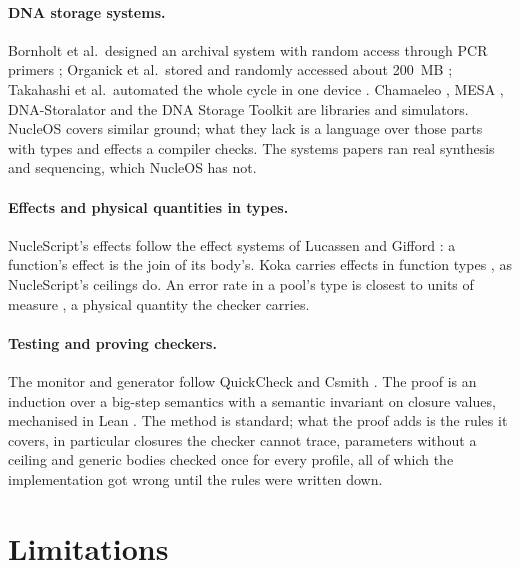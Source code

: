 \documentclass[11pt,a4paper]{article}
\begin{document}
\paragraph{DNA storage systems.} Bornholt et al.\ designed an archival
system with random access through PCR primers \cite{bornholt2016};
Organick et al.\ stored and randomly accessed about 200~MB
\cite{organick2018}; Takahashi et al.\ automated the whole cycle in one
device \cite{takahashi2019}. Chamaeleo \cite{chamaeleo}, MESA
\cite{mesa}, DNA-Storalator \cite{storalator} and the DNA Storage Toolkit
\cite{dnatoolkit} are libraries and simulators. NucleOS covers similar
ground; what they lack is a language over those parts with types and
effects a compiler checks. The systems papers ran real synthesis and
sequencing, which NucleOS has not.

\paragraph{Effects and physical quantities in types.} NucleScript's
effects follow the effect systems of Lucassen and Gifford
\cite{lucassen1988}: a function's effect is the join of its body's. Koka
carries effects in function types \cite{koka}, as NucleScript's ceilings
do. An error rate in a pool's type is closest to units of measure
\cite{kennedy1997}, a physical quantity the checker carries.

\paragraph{Testing and proving checkers.} The monitor and generator
follow QuickCheck \cite{quickcheck} and Csmith \cite{csmith}. The proof
is an induction over a big-step semantics with a semantic invariant on
closure values, mechanised in Lean \cite{lean4}. The method is standard;
what the proof adds is the rules it covers, in particular closures the
checker cannot trace, parameters without a ceiling and generic bodies
checked once for every profile, all of which the implementation got wrong
until the rules were written down.

\section{Limitations}
\label{sec:limits}
\end{document}
